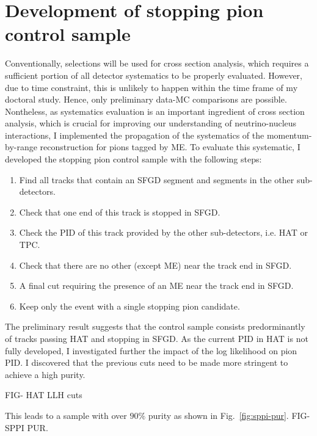     \section{Development of stopping pion control sample}
          Conventionally, selections will be used for cross section analysis, which requires a sufficient portion of all detector systematics to be properly evaluated.
          However, due to time constraint, this is unlikely to happen within the time frame of my doctoral study. 
          Hence, only preliminary data-MC comparisons are possible.
          Nontheless, as systematics evaluation is an important ingredient of cross section analysis, which is crucial for improving our understanding of neutrino-nucleus interactions, I implemented the propagation of the systematics of the momentum-by-range reconstruction for pions tagged by ME.
          To evaluate this systematic, I developed the stopping pion control sample with the following steps:
          \begin{enumerate}
          \item Find all tracks that contain an SFGD segment and segments in the other sub-detectors.
          \item Check that one end of this track is stopped in SFGD.
          \item Check the PID of this track provided by the other sub-detectors, i.e. HAT or TPC.
          \item Check that there are no other (except ME) near the track end in SFGD.
          \item A final cut requiring the presence of an ME near the track end in SFGD.
          \item Keep only the event with a single stopping pion candidate.
          \end{enumerate}
          The preliminary result suggests that the control sample consists predorminantly of tracks passing HAT and stopping in SFGD.
          As the current PID in HAT is not fully developed, I investigated further the impact of the log likelihood on pion PID.
          I discovered that the previous cuts need to be made more stringent to achieve a high purity.

          FIG- HAT LLH cuts

          This leads to a sample with over $90\%$ purity as shown in Fig.~\ref{fig:sppi-pur}.
          FIG- SPPI PUR.

           
    
    


